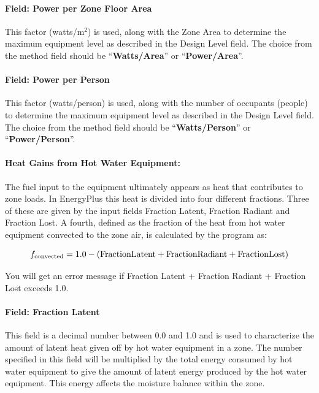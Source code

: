\paragraph{Field: Power per Zone Floor Area}\label{field-power-per-zone-floor-area-1}

This factor (watts/m\(^{2}\)) is used, along with the Zone Area to determine the maximum equipment level as described in the Design Level field. The choice from the method field should be ``\textbf{Watts/Area}'' or ``\textbf{Power/Area}''.

\paragraph{Field: Power per Person}\label{field-power-per-person-1}

This factor (watts/person) is used, along with the number of occupants (people) to determine the maximum equipment level as described in the Design Level field. The choice from the method field should be ``\textbf{Watts/Person}'' or ``\textbf{Power/Person}''.

\paragraph{Heat Gains from Hot Water Equipment:}\label{heat-gains-from-hot-water-equipment}

The fuel input to the equipment ultimately appears as heat that contributes to zone loads. In EnergyPlus this heat is divided into four different fractions. Three of these are given by the input fields Fraction Latent, Fraction Radiant and Fraction Lost. A fourth, defined as the fraction of the heat from hot water equipment convected to the zone air, is calculated by the program as:

\begin{equation}
  f_{\rm{convected}} = 1.0 - (\rm{Fraction Latent} + \rm{Fraction Radiant} + \rm{Fraction Lost})
\end{equation}

You will get an error message if Fraction Latent + Fraction Radiant + Fraction Lost exceeds 1.0.

\paragraph{Field: Fraction Latent}\label{field-fraction-latent-2}

This field is a decimal number between 0.0 and 1.0 and is used to characterize the amount of latent heat given off by hot water equipment in a zone. The number specified in this field will be multiplied by the total energy consumed by hot water equipment to give the amount of latent energy produced by the hot water equipment. This energy affects the moisture balance within the zone.

